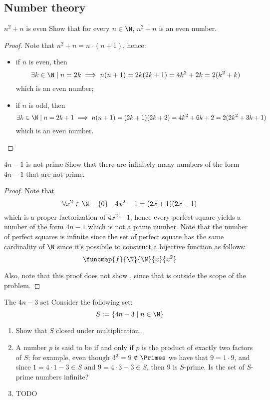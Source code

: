 \documentclass[a4paper, 12pt]{report}
\begin{document}
    \subsection{Number theory}

    \begin{framedprob}{$n^2 + n$ is even}
        Show that for every $n \in \N$, $n^2 + n$ is an even number.
    \end{framedprob}

    \begin{proof}
        Note that $n^2 + n = n \cdot (n + 1)$, hence:

        \begin{itemize}
            \item if $n$ is even, then $$\exists k \in \N \mid n = 2k \implies n(n + 1) = 2k(2k + 1) =4k^2 + 2k = 2(k^2+k)$$ which is an even number;
            \item if $n$ is odd, then $$\exists k \in \N \mid n = 2k + 1 \implies n(n + 1) = (2k + 1)(2k + 2) = 4k^2 + 6k + 2 = 2(2k^2 + 3k +1)$$ which is an even number.
        \end{itemize}
    \end{proof}

    \begin{framedprob}{$4n -1$ is not prime}
        Show that there are infinitely many numbers of the form $4n -1$ that are not prime.
    \end{framedprob}
    
    \begin{proof}
        Note that $$\forall x^2 \in \N - \{0\} \quad 4x^2 - 1 = (2x +1)(2x -1)$$ which is a proper factorization of $4x^2 -1$, hence every perfect square yields a number of the form $4n -1$ which is not a prime number. Note that the number of perfect squares is infinite since the set of perfect square has the same cardinality of $\N$ since it's possibile to construct a bijective function as follows: $$\funcmap{f}{\N}{\N}{x}{x^2}$$

        Also, note that this proof does not show , since that is outside the scope of the problem.
    \end{proof}

    \begin{framedprob}{The $4n - 3$ set}
        Consider the following set: $$S := \{4n - 3 \mid n \in \N\}$$

        \begin{enumerate}
            \item Show that $S$ closed under multiplication.
            \item A number $p$ is said to be  if and only if $p$ is the product of exactly two factors of $S$; for example, even though $3 ^2 = 9 \notin \Primes$ we have that $9 = 1 \cdot 9$, and since $1 = 4 \cdot 1 - 3 \in S$ and $9 = 4 \cdot 3 - 3 \in S$, then $9$ is $S$-prime. Is the set of $S$-prime numbers infinite?
            \item TODO
        \end{enumerate}
    \end{framedprob}
\end{document}
